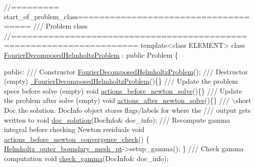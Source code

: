  
\begin{DoxyCodeInclude}
\textcolor{comment}{//========= start\_of\_problem\_class=====================================}
\textcolor{comment}{/// Problem class }
\textcolor{comment}{}\textcolor{comment}{//=====================================================================}
\textcolor{keyword}{template}<\textcolor{keyword}{class} ELEMENT> 
\textcolor{keyword}{class }\hyperlink{classFourierDecomposedHelmholtzProblem}{FourierDecomposedHelmholtzProblem} : \textcolor{keyword}{public} Problem
\{
 
\textcolor{keyword}{public}:
 \textcolor{comment}{}
\textcolor{comment}{ /// Constructor}
\textcolor{comment}{} \hyperlink{classFourierDecomposedHelmholtzProblem_ab368ed8fe04d4e3db67d13bab9e7b52e}{FourierDecomposedHelmholtzProblem}();
 \textcolor{comment}{}
\textcolor{comment}{ /// Destructor (empty)}
\textcolor{comment}{} \hyperlink{classFourierDecomposedHelmholtzProblem_a03174fa5a35b7c38f08f91bcd2a80c20}{~FourierDecomposedHelmholtzProblem}()\{\}
 \textcolor{comment}{}
\textcolor{comment}{ /// Update the problem specs before solve (empty)}
\textcolor{comment}{} \textcolor{keywordtype}{void} \hyperlink{classFourierDecomposedHelmholtzProblem_a82ef5a969f4404fc1acb35c38c800ce6}{actions\_before\_newton\_solve}()\{\}
 \textcolor{comment}{}
\textcolor{comment}{ /// Update the problem after solve (empty)}
\textcolor{comment}{} \textcolor{keywordtype}{void} \hyperlink{classFourierDecomposedHelmholtzProblem_a5a37ba3fcf8563764f80108c9a657929}{actions\_after\_newton\_solve}()\{\}
 \textcolor{comment}{}
\textcolor{comment}{ /// \(\backslash\)short Doc the solution. DocInfo object stores flags/labels for where the}
\textcolor{comment}{ /// output gets written to}
\textcolor{comment}{} \textcolor{keywordtype}{void} \hyperlink{classFourierDecomposedHelmholtzProblem_a893efb01f8f1d254315201121766d882}{doc\_solution}(DocInfo& doc\_info);
  \textcolor{comment}{}
\textcolor{comment}{ /// Recompute gamma integral before checking Newton residuals}
\textcolor{comment}{} \textcolor{keywordtype}{void} \hyperlink{classFourierDecomposedHelmholtzProblem_ae80673ef299e4935ddcac177ed919da3}{actions\_before\_newton\_convergence\_check}()
  \{
   \hyperlink{classFourierDecomposedHelmholtzProblem_ab7aafa9c0ab982d9e1fdc31d802d309b}{Helmholtz\_outer\_boundary\_mesh\_pt}->setup\_gamma();
  \}
\textcolor{comment}{}
\textcolor{comment}{ /// Check gamma computation}
\textcolor{comment}{} \textcolor{keywordtype}{void} \hyperlink{classFourierDecomposedHelmholtzProblem_ac4f3f737660b11e8762a61bca999eb0f}{check\_gamma}(DocInfo& doc\_info);
  

\end{DoxyCodeInclude}
